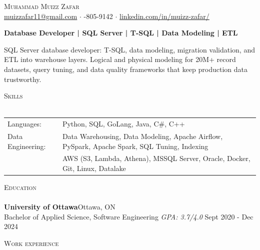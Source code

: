 \documentclass[a4paper]{article}
\newcommand{\lineunder} {
    \vspace*{-8pt} \\
    \hspace*{-18pt} \hrulefill \\
}
\newcommand{\header} [1] {
    {\hspace*{-18pt}\vspace*{6pt} \textsc{#1}}
    \vspace*{-6pt} \lineunder
}
\begin{document}
\vspace*{-40pt}

\vspace*{-10pt}
\begin{center}
	{\Huge \scshape {Muhammad Muizz Zafar}}\\
	\faSend \space \href{mailto:muizzafar11@gmail.com}{muizzafar11@gmail.com} $\cdot$ \faPhoneSquare {}-805-9142 $\cdot$ \faLinkedinSquare \space \href{https://www.linkedin.com/in/muizz-zafar/}{linkedin.com/in/muizz-zafar/}
	\\
\end{center}

\vspace{-5pt}
\begin{center}
\textbf{Database Developer | SQL Server | T-SQL | Data Modeling | ETL}
\end{center}
\begin{center}
SQL Server database developer: T-SQL, data modeling, migration validation, and ETL into warehouse layers. Logical and physical modeling for 20M+ record datasets, query tuning, and data quality frameworks that keep production data trustworthy.
\end{center}

\header{Skills}
\begin{tabular}{ l l }
	Languages: 
& Python, SQL, GoLang, Java, C\#, C++ \\

Data Engineering: 
& Data Warehousing, Data Modeling, Apache Airflow, PySpark, Apache Spark, SQL Tuning, Indexing\\
& AWS (S3, Lambda, Athena), MSSQL Server, Oracle, Docker, Git, Linux, Datalake

\end{tabular}

\header{Education}
\textbf{University of Ottawa}\hfill Ottawa, ON\\
Bachelor of Applied Science, Software Engineering \textit{GPA: 3.7/4.0} \hfill Sept 2020 - Dec 2024\\
\vspace{2mm}

\header{Work experience}
\vspace{1.5mm}
\end{document}
